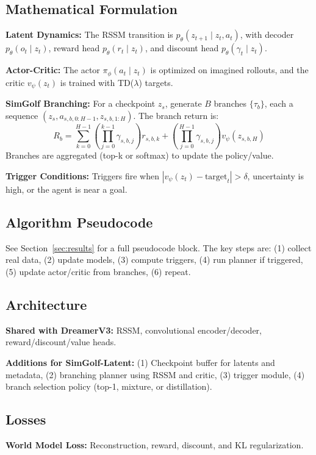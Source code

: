 \documentclass{article}
\begin{document}
\subsection{Mathematical Formulation}
\textbf{Latent Dynamics:} The RSSM transition is $p_\theta(z_{t+1} \mid z_t, a_t)$, with decoder $p_\theta(o_t \mid z_t)$, reward head $p_\theta(r_t \mid z_t)$, and discount head $p_\theta(\gamma_t \mid z_t)$.

\textbf{Actor-Critic:} The actor $\pi_\phi(a_t \mid z_t)$ is optimized on imagined rollouts, and the critic $v_\psi(z_t)$ is trained with TD($\lambda$) targets.

\textbf{SimGolf Branching:} For a checkpoint $z_s$, generate $B$ branches $\{\tau_b\}$, each a sequence $(z_s, a_{s,b,0:H-1}, z_{s,b,1:H})$. The branch return is:
\begin{equation}
R_b = \sum_{k=0}^{H-1} \left( \prod_{j=0}^{k-1} \gamma_{s,b,j} \right) r_{s,b,k} + \left( \prod_{j=0}^{H-1} \gamma_{s,b,j} \right) v_\psi(z_{s,b,H})
\end{equation}
Branches are aggregated (top-k or softmax) to update the policy/value.

\textbf{Trigger Conditions:} Triggers fire when $|v_\psi(z_t) - \text{target}_t| > \delta$, uncertainty is high, or the agent is near a goal.

\subsection{Algorithm Pseudocode}
See Section~\ref{sec:results} for a full pseudocode block. The key steps are: (1) collect real data, (2) update models, (3) compute triggers, (4) run planner if triggered, (5) update actor/critic from branches, (6) repeat.

\subsection{Architecture}
\textbf{Shared with DreamerV3:} RSSM, convolutional encoder/decoder, reward/discount/value heads.

\textbf{Additions for SimGolf-Latent:} (1) Checkpoint buffer for latents and metadata, (2) branching planner using RSSM and critic, (3) trigger module, (4) branch selection policy (top-1, mixture, or distillation).

\subsection{Losses}
\textbf{World Model Loss:} Reconstruction, reward, discount, and KL regularization.
\end{document}

